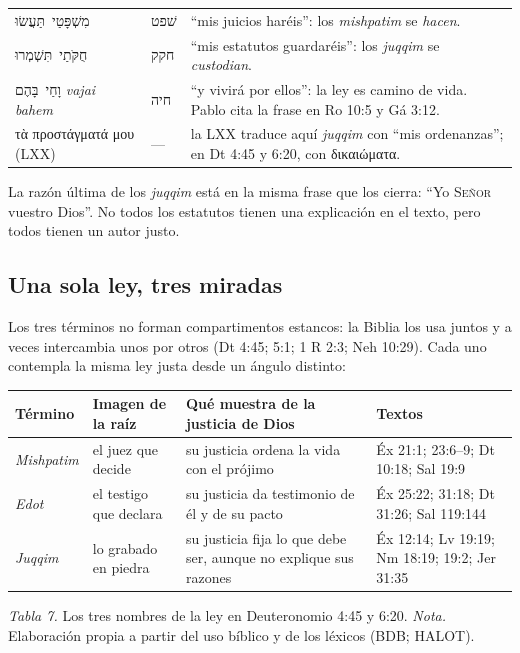 \documentclass[11pt,letterpaper]{article}
\newcommand{\heb}[1]{\mbox{\foreignlanguage{hebrew}{#1}}}
\newcommand{\grc}[1]{\foreignlanguage{ancientgreek}{#1}}
\newcommand{\SENOR}{\textsc{Señor}}
\begin{document}
\begin{filologia}[Lv 18:4--5]
\begin{tabular}{@{}L{3.2cm}L{1.6cm}L{10cm}@{}}
\heb{מִשְׁפָּטַי תַּעֲשׂוּ} & \heb{שׁפט} & ``mis juicios haréis'': los \emph{mishpatim} se \emph{hacen}. \\[2pt]
\heb{חֻקֹּתַי תִּשְׁמְרוּ} & \heb{חקק} & ``mis estatutos guardaréis'': los \emph{juqqim} se \emph{custodian}. \\[2pt]
\heb{וָחַי בָּהֶם} \emph{vajai bahem} & \heb{חיה} & ``y vivirá por ellos'': la ley es camino de vida. Pablo cita la frase en Ro 10:5 y Gá 3:12. \\[2pt]
\grc{τὰ προστάγματά μου} (LXX) & --- & la LXX traduce aquí \emph{juqqim} con ``mis ordenanzas''; en Dt 4:45 y 6:20, con \grc{δικαιώματα}. \\
\end{tabular}
\end{filologia}

La razón última de los \emph{juqqim} está en la misma frase que los cierra: ``Yo \SENOR{} vuestro Dios''. No todos los estatutos tienen una explicación en el texto, pero todos tienen un autor justo.

\subsection{Una sola ley, tres miradas}
Los tres términos no forman compartimentos estancos: la Biblia los usa juntos y a veces intercambia unos por otros (Dt 4:45; 5:1; 1 R 2:3; Neh 10:29). Cada uno contempla la misma ley justa desde un ángulo distinto:

\begin{center}\small\renewcommand{\arraystretch}{1.22}
\begin{tabular}{@{}L{2.3cm}L{3.6cm}L{3.8cm}L{4.4cm}@{}}
\toprule
\textbf{Término} & \textbf{Imagen de la raíz} & \textbf{Qué muestra de la justicia de Dios} & \textbf{Textos} \\ \midrule
\emph{Mishpatim} & el juez que decide & su justicia ordena la vida con el prójimo & Éx 21:1; 23:6--9; Dt 10:18; Sal 19:9 \\
\emph{Edot} & el testigo que declara & su justicia da testimonio de él y de su pacto & Éx 25:22; 31:18; Dt 31:26; Sal 119:144 \\
\emph{Juqqim} & lo grabado en piedra & su justicia fija lo que debe ser, aunque no explique sus razones & Éx 12:14; Lv 19:19; Nm 18:19; 19:2; Jer 31:35 \\
\bottomrule
\end{tabular}\par
{\footnotesize\color{gris}\textit{Tabla 7.} Los tres nombres de la ley en Deuteronomio 4:45 y 6:20. \textit{Nota.} Elaboración propia a partir del uso bíblico y de los léxicos (BDB; HALOT).}
\end{center}
\end{document}
